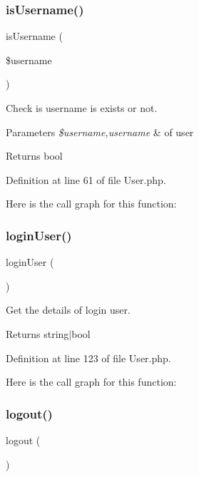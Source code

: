 \subsubsection{\texorpdfstring{is\+Username()}{isUsername()}}
{\footnotesize\ttfamily is\+Username (\begin{DoxyParamCaption}\item[{}]{\$username }\end{DoxyParamCaption})}

Check is username is exists or not.


\begin{DoxyParams}{Parameters}
{\em \$username,username} & of user\\
\hline
\end{DoxyParams}
\begin{DoxyReturn}{Returns}
bool 
\end{DoxyReturn}


Definition at line 61 of file User.\+php.

Here is the call graph for this function\+:
\mbox{\label{class_zest_1_1_auth_1_1_user_a6083b365f5ea600dd590280b73cf3f08}} 
\subsubsection{\texorpdfstring{login\+User()}{loginUser()}}
{\footnotesize\ttfamily login\+User (\begin{DoxyParamCaption}{ }\end{DoxyParamCaption})}

Get the details of login user.

\begin{DoxyReturn}{Returns}
string$\vert$bool 
\end{DoxyReturn}


Definition at line 123 of file User.\+php.

Here is the call graph for this function\+:
\mbox{\label{class_zest_1_1_auth_1_1_user_a082405d89acd6835c3a7c7a08a7adbab}} 
\subsubsection{\texorpdfstring{logout()}{logout()}}
{\footnotesize\ttfamily logout (\begin{DoxyParamCaption}{ }\end{DoxyParamCaption})}

